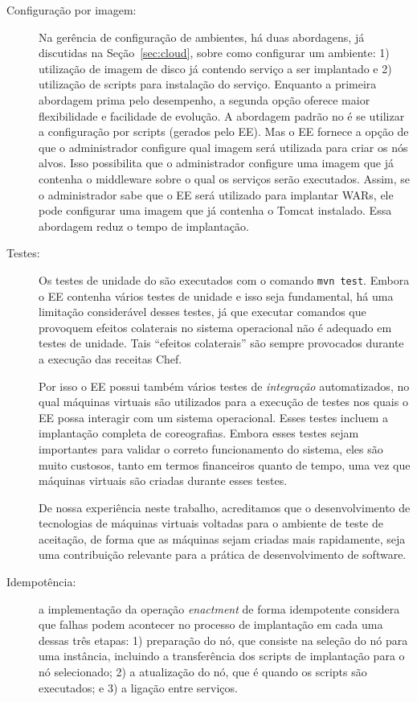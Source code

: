 \begin{description}
\item [Configuração por imagem:]

Na gerência de configuração de ambientes, há duas abordagens, 
já discutidas na Seção~\ref{sec:cloud}, sobre como configurar um ambiente:
1) utilização de imagem de disco já contendo serviço a ser implantado
e 2) utilização de scripts para instalação do serviço.
Enquanto a primeira abordagem prima pelo desempenho,
a segunda opção oferece maior flexibilidade e facilidade de evolução.
A abordagem padrão no \ee é se utilizar a configuração por scripts (gerados pelo EE).
Mas o EE fornece a opção de que o administrador configure qual imagem será
utilizada para criar os nós alvos.
Isso possibilita que o administrador configure uma imagem 
que já contenha o middleware sobre o qual os serviços serão executados.
Assim, se o administrador sabe que o EE será utilizado para implantar WARs,
ele pode configurar uma imagem que já contenha o Tomcat instalado.
Essa abordagem reduz o tempo de implantação.

\item [Testes:] 

Os testes de unidade do \ee são executados com o comando \texttt{mvn test}.
Embora o EE contenha vários testes de unidade e isso seja fundamental,
há uma limitação considerável desses testes, já que executar comandos que
provoquem efeitos colaterais no sistema operacional não é adequado
em testes de unidade. Tais ``efeitos colaterais'' são sempre provocados
durante a execução das receitas Chef.

Por isso o EE possui também vários testes de \emph{integração} automatizados,
no qual máquinas virtuais são utilizados para a execução de testes nos
quais o EE possa interagir com um sistema operacional.
Esses testes incluem a implantação completa de coreografias.
Embora esses testes sejam importantes para validar o correto funcionamento do sistema,
eles são muito custosos, tanto em termos financeiros quanto de tempo,
uma vez que máquinas virtuais são criadas durante esses testes.

De nossa experiência neste trabalho, acreditamos que
o desenvolvimento de tecnologias de máquinas virtuais
voltadas para o ambiente de teste de aceitação,
de forma que as máquinas sejam criadas mais rapidamente,
seja uma contribuição relevante para a prática de desenvolvimento de software.

\item [Idempotência:] a implementação da operação \emph{enactment} de forma idempotente considera
que falhas podem acontecer no processo de implantação em cada uma dessas três etapas: 
1) preparação do nó, que consiste na seleção do nó para uma instância, 
incluindo a transferência dos scripts de implantação para o nó selecionado;
2) a atualização do nó, que é quando os scripts são executados;
e 3) a ligação entre serviços.


\end{description}
